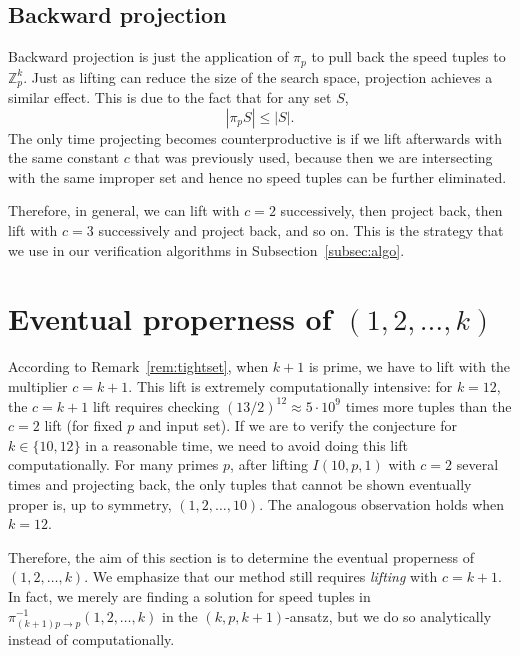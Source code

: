 \documentclass[11pt]{amsart}
\newcommand{\Z}{\mathbb{Z}}
\newcommand{\onetok}{(1, 2, \dots, k)}
\theoremstyle{definition}
\theoremstyle{remark}
\begin{document}
\subsection{Backward projection}
\label{subsec:backproj}
Backward projection is just the application of $\pi_p$ to pull back the speed tuples to $\Z^k_{p}$.
Just as lifting can reduce the size of the search space, projection achieves a similar effect. 
This is due to the fact that for any set $S$,
\[|\pi_p S| \leq |S|.\]
The only time projecting becomes counterproductive is if we lift afterwards with the same constant $c$ that was previously used,
because then we are intersecting with the same improper set and hence no speed tuples can be further eliminated.

Therefore, in general, we can lift with $c=2$ successively, then project back, 
then lift with $c=3$ successively and project back, and so on. 
This is the strategy that we use in our verification algorithms in Subsection~\ref{subsec:algo}.

\section{Eventual properness of
  \texorpdfstring{$(1, 2,\ldots, k)$}{(1, 2, ..., k)}
} \label{sec:onetok}
According to Remark~\ref{rem:tightset}, when $k+1$ is prime, we have to lift with the multiplier $c=k+1$. 
This lift is extremely computationally intensive: for $k=12$, the $c=k+1$ lift requires checking $(13/2)^{12}\approx5\cdot10^9$ 
times more tuples than the $c=2$ lift (for fixed $p$ and input set).
If we are to verify the conjecture for $k\in\{10,12\}$ in a reasonable time, we need to avoid doing this lift computationally.
For many primes $p$, after lifting $I(10,p,1)$ with $c=2$ several times and projecting back,
the only tuples that cannot be shown eventually proper is, up to symmetry, $( 1, 2, \ldots, 10 )$. 
The analogous observation holds when $k=12$.

Therefore, the aim of this section is to determine the eventual properness
of $\onetok$. 
We emphasize that our method still requires \emph{lifting} with $c=k+1$. 
In fact, we merely are finding a solution for speed tuples in $\pi^{-1}_{(k+1)p\rightarrow p}\onetok$ in the $(k,p,k+1)$-ansatz,
but we do so analytically instead of computationally.
\end{document}
